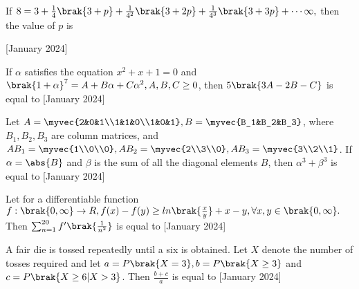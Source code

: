 \iffalse
\title{2024}
\author{EE24BTECH11066}
\section{integer}
\fi
\item If $8=3+\frac{1}{4}\brak{3+p}+\frac{1}{4^2}\brak{3+2p}+\frac{1}{4^3}\brak{3+3p}+\cdots\infty,$ then the value of $p$ is \underline{\hspace{1cm}} 

    \hfill{[January 2024]}\\

\item If $\alpha$ satisfies the equation $x^2+x+1=0$ and $\brak{1+\alpha}^7=A+B\alpha+C\alpha^{2}, A, B,C \geq 0$, then $5\brak{3A-2B-C}$ is equal to \underline{\hspace{1cm}} \hfill{[January 2024]}\\

\item Let $A=\myvec{2&0&1\\1&1&0\\1&0&1}, B=\myvec{B_1&B_2&B_3}$, where $B_1,B_2,B_3$ are column matrices, and $AB_1=\myvec{1\\0\\0}, AB_2=\myvec{2\\3\\0}, AB_3=\myvec{3\\2\\1}$. If $\alpha=\abs{B}$ and $\beta$ is the sum of all the diagonal elements $B$, then $\alpha ^3+\beta ^3$ is equal to  \underline{\hspace{1cm}} \hfill{[January 2024]}\\

\item Let for a differentiable function $f : \brak{0, \infty}\rightarrow R, f(x)-f(y)\geq ln\brak{\frac{x}{y}}+x-y,\forall x,y \in\brak{0,\infty}.$ Then $\sum_{n=1}^{20}f'\brak{\frac{1}{n^2}}$ is equal to \underline{\hspace{1cm}} \hfill{[January 2024]}\\

\item A fair die is tossed repeatedly until a six is obtained. Let $X$ denote the number of tosses required and let $a=P\brak{X=3}, b=P\brak{X\geq 3}$ and $c=P\brak{X\geq 6 |X>3}$. Then $\frac{b+c}{a}$ is equal to \underline{\hspace{1cm}} \hfill{[January 2024]}\\

